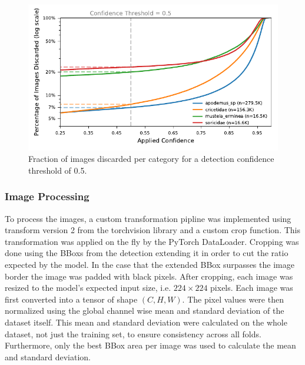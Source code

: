         \begin{figure}[ht]
        \centering
        \includegraphics{figures/discarded_img_by_conf.pdf}
        \caption{Fraction of images discarded per category for a detection confidence threshold of 0.5.}
        \label{fig:lost_images}
        \end{figure}        

        \subsubsection{Image Processing}
        To process the images, a custom transformation pipline was implemented using transform version 2 from the torchvision library and a custom crop function.
        This transformation was applied on the fly by the PyTorch DataLoader.
        Cropping was done using the \acp{BBox} from the detection extending it in order to cut the ratio expected by the model.
        In the case that the extended \ac{BBox} surpasses the image border the image was padded with black pixels.
        After cropping, each image was resized to the model's expected input size, i.e. \(224\times224\) pixels.
        Each image was first converted into a tensor of shape \((C,H,W)\). 
        The pixel values were then normalized using the global channel wise mean and standard deviation of the dataset itself.
        This mean and standard deviation were calculated on the whole dataset, not just the training set, to ensure consistency across all folds.
        Furthermore, only the best \ac{BBox} area per image was used to calculate the mean and standard deviation.

